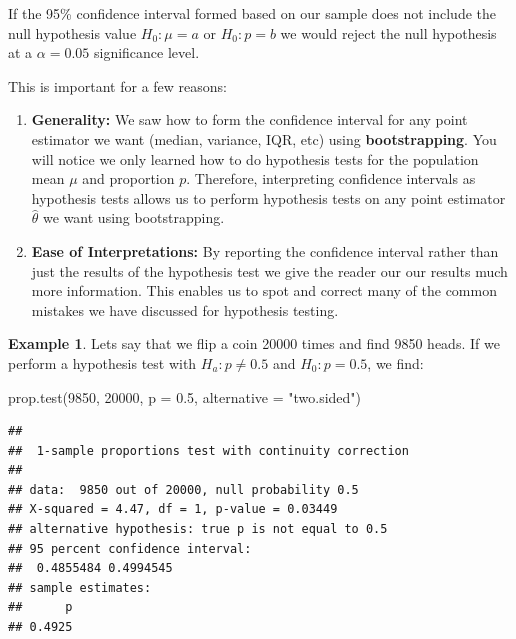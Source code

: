 \documentclass[
]{book}
\newenvironment{Shaded}{\begin{snugshade}}{\end{snugshade}}
\newcommand{\AttributeTok}[1]{\textcolor[rgb]{0.77,0.63,0.00}{#1}}
\newcommand{\DecValTok}[1]{\textcolor[rgb]{0.00,0.00,0.81}{#1}}
\newcommand{\FloatTok}[1]{\textcolor[rgb]{0.00,0.00,0.81}{#1}}
\newcommand{\FunctionTok}[1]{\textcolor[rgb]{0.00,0.00,0.00}{#1}}
\newcommand{\NormalTok}[1]{#1}
\newcommand{\StringTok}[1]{\textcolor[rgb]{0.31,0.60,0.02}{#1}}
\theoremstyle{definition}
\theoremstyle{definition}
\newtheorem{example}{Example}[chapter]
\theoremstyle{definition}
\theoremstyle{definition}
\theoremstyle{remark}
\begin{document}
If the 95\% confidence interval formed based on our sample does not include the null hypothesis value \(H_0: \mu=a\) or \(H_0: p=b\) we would reject the null hypothesis at a \(\alpha=0.05\) significance level.

This is important for a few reasons:

\begin{enumerate}
\def\labelenumi{\arabic{enumi}.}
\item
  \textbf{Generality: } We saw how to form the confidence interval for any point estimator we want (median, variance, IQR, etc) using \textbf{bootstrapping}. You will notice we only learned how to do hypothesis tests for the population mean \(\mu\) and proportion \(p\). Therefore, interpreting confidence intervals as hypothesis tests allows us to perform hypothesis tests on any point estimator \(\hat{\theta}\) we want using bootstrapping.
\item
  \textbf{Ease of Interpretations:} By reporting the confidence interval rather than just the results of the hypothesis test we give the reader our our results much more information. This enables us to spot and correct many of the common mistakes we have discussed for hypothesis testing.
\end{enumerate}

\begin{example}
\protect\hypertarget{exm:unnamed-chunk-574}{}\label{exm:unnamed-chunk-574}Lets say that we flip a coin 20000 times and find 9850 heads. If we perform a hypothesis test with \(H_a: p\neq 0.5\) and \(H_0:p=0.5\), we find:
\end{example}

\begin{Shaded}
\begin{Highlighting}[]
\FunctionTok{prop.test}\NormalTok{(}\DecValTok{9850}\NormalTok{, }\DecValTok{20000}\NormalTok{, }\AttributeTok{p =} \FloatTok{0.5}\NormalTok{, }\AttributeTok{alternative =} \StringTok{"two.sided"}\NormalTok{)}
\end{Highlighting}
\end{Shaded}

\begin{verbatim}
## 
##  1-sample proportions test with continuity correction
## 
## data:  9850 out of 20000, null probability 0.5
## X-squared = 4.47, df = 1, p-value = 0.03449
## alternative hypothesis: true p is not equal to 0.5
## 95 percent confidence interval:
##  0.4855484 0.4994545
## sample estimates:
##      p 
## 0.4925
\end{verbatim}
\end{document}
